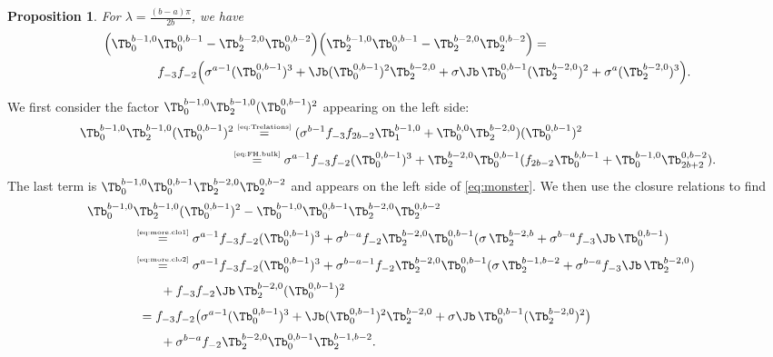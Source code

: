 \documentclass[11pt]{article}
\numberwithin{equation}{section}
\theoremstyle{plain}
\newtheorem{Proposition}{Proposition}[section]
\numberwithin{equation}{section}
\begin{document}
\begin{Proposition}
For $\lambda = \frac{(b-a)\pi}{2b}$, we have
\begin{alignat}{2}
\Big(\Tb^{b-1,0}_0&\Tb^{0,b-1}_0-\Tb^{b-2,0}_2\Tb^{0,b-2}_0\Big)\Big(\Tb^{b-1,0}_2\Tb^{0,b-1}_0-\Tb^{b-2,0}_2\Tb^{0,b-2}_2\Big) = \nonumber\\ &f_{-3}f_{-2} \Big( \sigma^{a-1}(\Tb^{0,b-1}_0)^3 +  \Jb (\Tb^{0,b-1}_0)^2 \Tb^{b-2,0}_2 + \sigma \Jb\, \Tb^{0,b-1}_0 (\Tb^{b-2,0}_2)^2 + \sigma^a(\Tb^{b-2,0}_2)^3 \Big).
\label{eq:monster}
\end{alignat}
\end{Proposition}
\proof
We first consider the factor $\Tb^{b-1,0}_0\Tb^{b-1,0}_2(\Tb^{0,b-1}_0)^2$ appearing on the left side: 
\begin{alignat}{2}
\Tb^{b-1,0}_0\Tb^{b-1,0}_2(\Tb^{0,b-1}_0)^2 &\overset{\textrm{\tiny\eqref{eq:Trelations}}}{=} (\sigma^{b-1} f_{-3}f_{2b-2}\Tb^{b-1,0}_1 + \Tb^{b,0}_0\Tb^{b-2,0}_2)(\Tb^{0,b-1}_0)^2
\nonumber\\[0.1cm]
&\hspace{-0.1cm}\overset{\textrm{\tiny\eqref{eq:FH.bulk}}}{=} \sigma^{a-1}f_{-3}f_{-2}(\Tb^{0,b-1}_0)^3 + \Tb^{b-2,0}_2 \Tb^{0,b-1}_0(f_{2b-2}\Tb^{b,b-1}_0 + \Tb^{b-1,0}_0 \Tb^{0,b-2}_{2b+2}).
\end{alignat}
The last term is $\Tb^{b-1,0}_0 \Tb^{0,b-1}_0\Tb^{b-2,0}_2\Tb^{0,b-2}_2$ and appears on the left side of \eqref{eq:monster}. We then use the closure relations to find
\begin{alignat}{2}
\Tb^{b-1,0}_0&\Tb^{b-1,0}_2(\Tb^{0,b-1}_0)^2 - \Tb^{b-1,0}_0 \Tb^{0,b-1}_0\Tb^{b-2,0}_2\Tb^{0,b-2}_2 &
\nonumber\\[0.1cm]
&\overset{\textrm{\tiny\eqref{eq:more.clo1}}}{=} \sigma^{a-1} f_{-3}f_{-2}(\Tb^{0,b-1}_0)^3 + \sigma^{b-a} f_{-2}\Tb^{b-2,0}_2 \Tb^{0,b-1}_0 (\sigma\, \Tb^{b-2,b}_2 + \sigma^{b-a} f_{-3} \Jb\, \Tb^{0,b-1}_0)&
\nonumber\\[0.1cm]
&\overset{\textrm{\tiny\eqref{eq:more.clo2}}}{=} \sigma^{a-1} f_{-3}f_{-2}(\Tb^{0,b-1}_0)^3 + \sigma^{b-a-1} f_{-2}\Tb^{b-2,0}_2 \Tb^{0,b-1}_0 (\sigma \, \Tb^{b-1,b-2}_2 + \sigma^{b-a} f_{-3} \Jb \, \Tb^{b-2,0}_2) 
\nonumber\\[0.1cm]
&\hspace{0.75cm} + f_{-3}f_{-2} \Jb\, \Tb^{b-2,0}_2 (\Tb^{0,b-1}_0)^2
\nonumber\\[0.1cm]
&\hspace{0.15cm} = f_{-3}f_{-2} \big(\sigma^{a-1} (\Tb^{0,b-1}_0)^3 + \Jb (\Tb^{0,b-1}_0)^2 \Tb^{b-2,0}_2 + \sigma \Jb \, \Tb^{0,b-1}_0 (\Tb^{b-2,0}_2)^2 \big) 
\nonumber\\[0.1cm]
&\hspace{0.75cm} + \sigma^{b-a}f_{-2} \Tb^{b-2,0}_2\Tb^{0,b-1}_0 \Tb^{b-1,b-2}_2.
\end{alignat}
\end{document}
